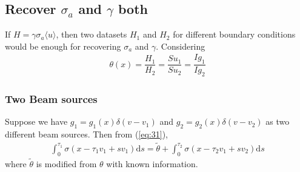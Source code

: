 \documentclass[12pt,a4paper]{article}
\newcommand{\avg}[1]{\langle#1\rangle}
\begin{document}
\subsection{Recover $\sigma_a$ and $\gamma$ both}
If $H = \gamma\sigma_a \avg{u}$, then two datasets $H_1$ and $H_2$ for different boundary conditions would be enough for recovering $\sigma_a$ and $\gamma$. Considering 
\begin{eqnarray}\label{eq:31}
\theta(x) = \dfrac{H_1}{H_2} = \dfrac{Su_1}{Su_2} =\dfrac{Ig_1}{Ig_2}
\end{eqnarray}
\subsubsection{Two Beam sources}
Suppose we have $g_1 = g_1(x)\delta(v - v_1)$ and $g_2 = g_2(x)\delta(v- v_2)$ as two different beam sources. Then from (\ref{eq:31}), 
\begin{eqnarray}
\int_0^{\tau_1}\sigma(x - \tau_1 v_1 + sv_1)\mathrm{d}s= \tilde{\theta}+\int_0^{\tau_2}\sigma(x - \tau_2 v_1 + sv_2)\mathrm{d}s
\end{eqnarray}
where $\tilde{\theta}$ is modified from $\theta$ with known information.
\end{document}
